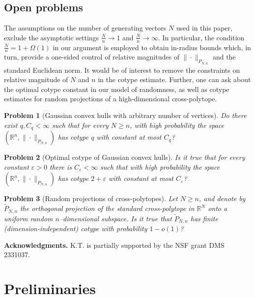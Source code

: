 \documentclass[11pt]{amsart}
\newtheorem*{problem*}{Problem}
\theoremstyle{definition}
\theoremstyle{plain}
\newcommand{\R}{\mathbb{R}}
\def\R{{\mathbb R}}
\begin{document}
\subsection{Open problems}
The assumptions on the number of generating vectors $N$
used in this paper, exclude the asymptotic
settings $\frac{N}{n}\to 1$ and $\frac{N}{n}\to\infty$.
In particular, the condition $\frac{N}{n}=1+\Omega(1)$
in our argument is employed to obtain in-radius bounds
which, in turn, provide a one-sided control of 
relative magnitudes of $\|\cdot\|_{P_{N,n}}$
and the standard Euclidean norm.
It would be of interest to remove the constraints on relative magnitude
of $N$ and $n$ in the cotype estimate. Further,
one can ask about the optimal cotype constant in our model of randomness,
as well as cotype estimates for random projections of a high-dimensional
cross-polytope.

\begin{problem*}[Gaussian convex hulls with arbitrary number of vertices]
Do there exist $q,C_q<\infty$ such that
for every $N\geq n$, with high probability the space 
$(\R^n,\|\cdot\|_{P_{N,n}})$
has cotype $q$ with constant at most $C_q$?
\end{problem*}

\begin{problem*}[Optimal cotype of Gaussian convex hulls]
Is it true that for every constant $\varepsilon>0$
there is $C_\varepsilon<\infty$ such that
with high probability
the space $(\R^n,\|\cdot\|_{P_{N,n}})$
has cotype $2+\varepsilon$ with constant at most $C_\varepsilon$?
\end{problem*}

\begin{problem*}[Random projections of cross-polytopes]
Let $N\geq n$, and denote by $\tilde P_{N,n}$
the orthogonal projection of the standard cross-polytope in $\R^N$
onto a uniform random $n$--dimensional subspace. Is it true that
$\tilde P_{N,n}$ has finite (dimension-independent) cotype with probability $1-o(1)$?
\end{problem*}



\bigskip

{\bf Acknowledgments.}
K.T. is partially supported by the NSF grant DMS 2331037.





\section{Preliminaries}
\end{document}
